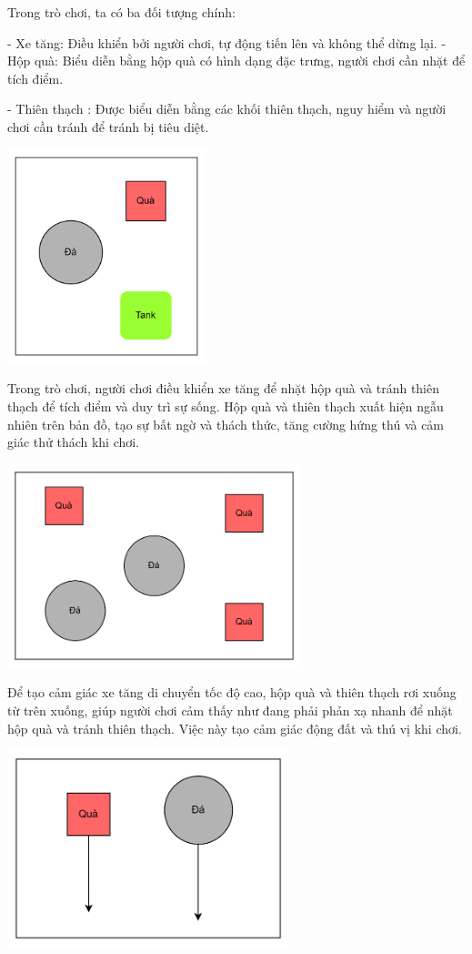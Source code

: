 \documentclass[a4paper]{article}
\begin{document}
Trong trò chơi, ta có ba đối tượng chính:

- Xe tăng: Điều khiển bởi người chơi, tự động tiến lên và không thể dừng
lại. - Hộp quà: Biểu diễn bằng hộp quà có hình dạng đặc trưng, người
chơi cần nhặt để tích điểm.

- Thiên thạch : Được biểu diễn bằng các khối thiên thạch, nguy hiểm và
người chơi cần tránh để tránh bị tiêu diệt.

\includegraphics[width=2.27083in,height=2.45139in]{image7.png}

Trong trò chơi, người chơi điều khiển xe tăng để nhặt hộp quà và tránh
thiên thạch để tích điểm và duy trì sự sống. Hộp quà và thiên thạch xuất
hiện ngẫu nhiên trên bản đồ, tạo sự bất ngờ và thách thức, tăng cường
hứng thú và cảm giác thử thách khi chơi.

\includegraphics[width=3.36806in,height=2.32222in]{image8.png}

Để tạo cảm giác xe tăng di chuyển tốc độ cao, hộp quà và thiên thạch rơi
xuống từ trên xuống, giúp người chơi cảm thấy như đang phải phản xạ
nhanh để nhặt hộp quà và tránh thiên thạch. Việc này tạo cảm giác động
đất và thú vị khi chơi.

\includegraphics[width=3.22639in,height=2.25in]{image9.png}
\end{document}
